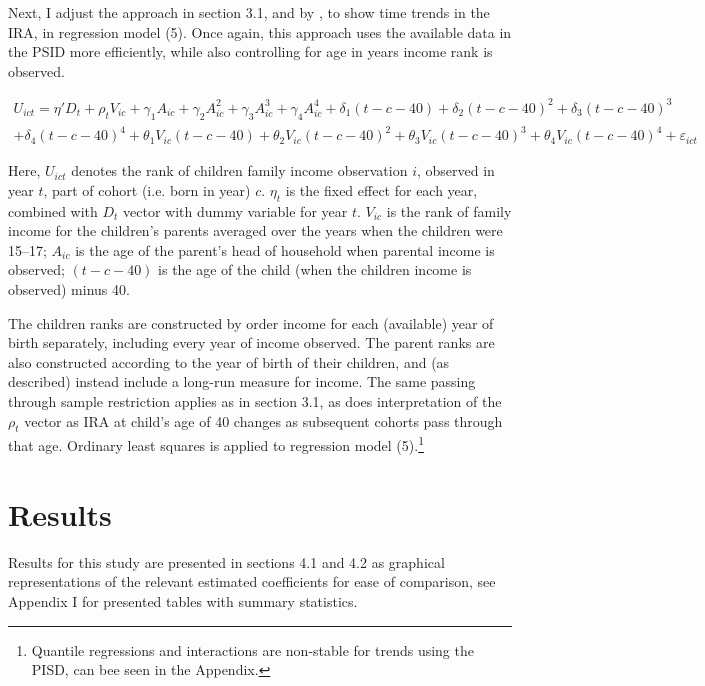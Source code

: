 \documentclass[notitlepage,12pt]{article}
\begin{document}
Next, I adjust the approach in section 3.1, and by \cite{lee2009trends}, to show time trends in the IRA, in regression model (5).  Once again, this approach uses the available data in the PSID more efficiently, while also controlling for age in years income rank is observed.

\begin{multline}
U_{ict}=\eta'D_t
+ \rho_t V_{ic} 
+ \gamma_1 A_{ic}  
+ \gamma_2 A_{ic}^2
+ \gamma_3 A_{ic}^3 
+ \gamma_4 A_{ic}^4
+ \delta_1 (t-c-40)
+ \delta_2 (t-c-40)^2
+ \delta_3 (t-c-40)^3  \\  
+ \delta_4 (t-c-40)^4
+ \theta_1 V_{ic} (t-c-40)
+ \theta_2 V_{ic} (t-c-40)^2
+ \theta_3 V_{ic} (t-c-40)^3
+ \theta_4 V_{ic} (t-c-40)^4
+ \varepsilon_{ict}
\end{multline} 

Here, $U_{ict}$ denotes the rank of children family income observation $i$, observed in year $t$, part of cohort (i.e. born in year) $c$.  $\eta_t$ is the fixed effect for each year, combined with $D_t$ vector with dummy variable for year $t$.  $V_{ic}$ is the rank of family income for the children's parents averaged over the years when the children were 15--17; $A_{ic}$ is the age of the parent's head of household when parental income is observed;  $(t-c-40)$ is the age of the child (when the children income is observed) minus 40.  

The children ranks are constructed by order income for each (available) year of birth separately, including every year of income observed.  The parent ranks are also constructed according to the year of birth of their children, and (as described) instead include a long-run measure for income.  The same passing through sample restriction applies as in section 3.1, as does interpretation of the $\rho_t$ vector as IRA at child's age of 40 changes as subsequent cohorts pass through that age.  Ordinary least squares is applied to regression model (5).\footnote{Quantile regressions and interactions are non-stable for trends using the PISD, can bee seen in the Appendix.}

\section{Results}
Results for this study are presented in sections 4.1 and 4.2 as graphical representations of the relevant estimated coefficients for ease of comparison, see Appendix I for presented tables with summary statistics. 
\end{document}
